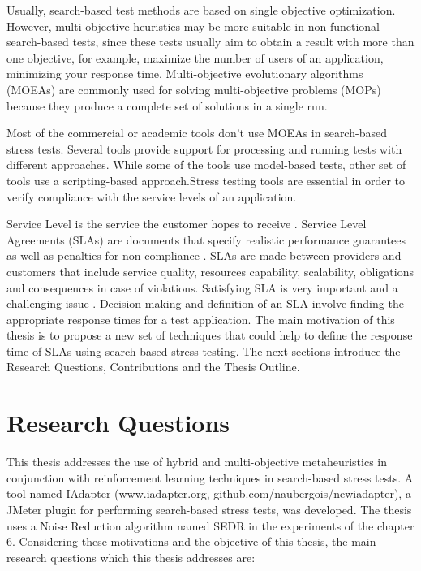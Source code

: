 \documentclass[espaco=umemeio,chapter=TITLE,twoside,openright]{abnt}
\begin{document}
Usually, search-based test methods are based on single objective optimization. However, multi-objective heuristics may be more suitable in non-functional search-based tests, since these tests usually aim to obtain a result with more than one objective, for example, maximize the number of users of an application, minimizing your response time. Multi-objective evolutionary algorithms (MOEAs) are commonly used for solving multi-objective problems (MOPs) because they produce a complete set of solutions in a single run. 

Most of the commercial or academic tools don't use MOEAs in search-based stress tests. Several tools provide support for processing and running tests with different approaches. While some of the tools use model-based tests, other set of tools use a scripting-based approach.Stress testing tools are essential in order to verify compliance with the service levels of an application.

Service Level is the service the customer hopes to receive \cite{Parasuraman1991}. Service Level Agreements (SLAs)  are documents that specify realistic performance guarantees as well as
penalties for non-compliance \cite{Menasce2002b}.   SLAs are made between providers and customers that include service quality, resources
capability, scalability, obligations and consequences in case of
violations. Satisfying SLA is very important and a challenging
issue \cite{Rajeshwari2016}. Decision making and definition of an SLA involve finding the appropriate response times for a test application. The main motivation of this thesis is to propose a new set of techniques that could help to define the response time of SLAs using search-based stress testing. The next sections introduce the Research Questions, Contributions and the Thesis Outline. 

\section{Research Questions}

This thesis addresses the use of hybrid and multi-objective metaheuristics in conjunction with reinforcement learning techniques in search-based stress tests. A tool named IAdapter (www.iadapter.org, github.com/naubergois/newiadapter), a JMeter plugin for performing search-based stress tests, was developed. The thesis uses a Noise Reduction algorithm named SEDR in the experiments of the chapter 6. Considering these motivations and the objective of this thesis, the main research questions which this thesis addresses are:
\end{document}
